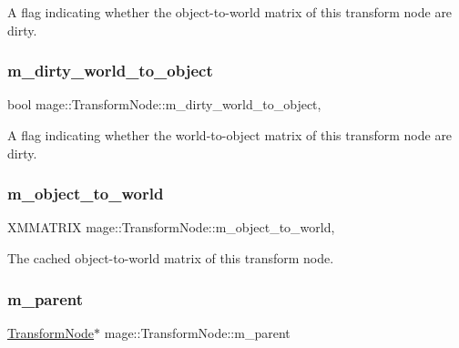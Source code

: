 A flag indicating whether the object-\/to-\/world matrix of this transform node are dirty. \hypertarget{classmage_1_1_transform_node_acb9046e0096ada337e1978f016daa144}{}\label{classmage_1_1_transform_node_acb9046e0096ada337e1978f016daa144} 
\subsubsection{\texorpdfstring{m\+\_\+dirty\+\_\+world\+\_\+to\+\_\+object}{m\_dirty\_world\_to\_object}}
{\footnotesize\ttfamily bool mage\+::\+Transform\+Node\+::m\+\_\+dirty\+\_\+world\+\_\+to\+\_\+object\hspace{0.3cm}{\ttfamily [mutable]}, {\ttfamily [private]}}

A flag indicating whether the world-\/to-\/object matrix of this transform node are dirty. \hypertarget{classmage_1_1_transform_node_a79de447d6d40226d7ceb276007f5fbeb}{}\label{classmage_1_1_transform_node_a79de447d6d40226d7ceb276007f5fbeb} 
\subsubsection{\texorpdfstring{m\+\_\+object\+\_\+to\+\_\+world}{m\_object\_to\_world}}
{\footnotesize\ttfamily X\+M\+M\+A\+T\+R\+IX mage\+::\+Transform\+Node\+::m\+\_\+object\+\_\+to\+\_\+world\hspace{0.3cm}{\ttfamily [mutable]}, {\ttfamily [private]}}

The cached object-\/to-\/world matrix of this transform node. \hypertarget{classmage_1_1_transform_node_a8bb7cfa7292d63f96eedb09b313e1ddb}{}\label{classmage_1_1_transform_node_a8bb7cfa7292d63f96eedb09b313e1ddb} 
\subsubsection{\texorpdfstring{m\+\_\+parent}{m\_parent}}
{\footnotesize\ttfamily \hyperlink{classmage_1_1_transform_node}{Transform\+Node}$\ast$ mage\+::\+Transform\+Node\+::m\+\_\+parent\hspace{0.3cm}{\ttfamily [private]}}

